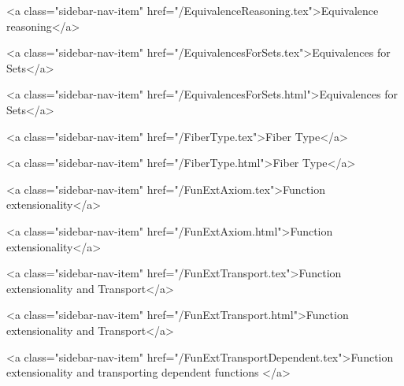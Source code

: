       
        
          <a class="sidebar-nav-item" href="/EquivalenceReasoning.tex">Equivalence reasoning</a>
        
      
    
      
        
          <a class="sidebar-nav-item" href="/EquivalencesForSets.tex">Equivalences for Sets</a>
        
      
    
      
        
          <a class="sidebar-nav-item" href="/EquivalencesForSets.html">Equivalences for Sets</a>
        
      
    
      
        
          <a class="sidebar-nav-item" href="/FiberType.tex">Fiber Type</a>
        
      
    
      
        
          <a class="sidebar-nav-item" href="/FiberType.html">Fiber Type</a>
        
      
    
      
        
          <a class="sidebar-nav-item" href="/FunExtAxiom.tex">Function extensionality</a>
        
      
    
      
        
          <a class="sidebar-nav-item" href="/FunExtAxiom.html">Function extensionality</a>
        
      
    
      
        
          <a class="sidebar-nav-item" href="/FunExtTransport.tex">Function extensionality and Transport</a>
        
      
    
      
        
          <a class="sidebar-nav-item" href="/FunExtTransport.html">Function extensionality and Transport</a>
        
      
    
      
        
          <a class="sidebar-nav-item" href="/FunExtTransportDependent.tex">Function extensionality and transporting dependent functions </a>
        
      
    
      
        
